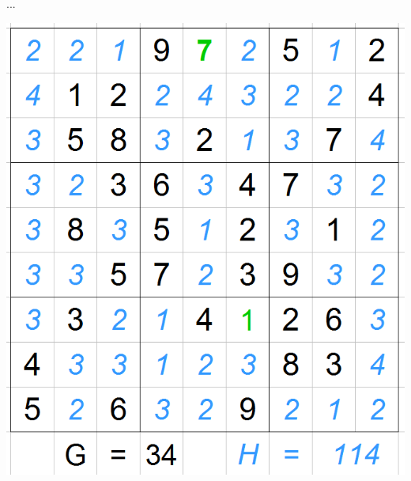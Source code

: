 \begin{frame}
\begin{minipage}{.45\textwidth}
\end{minipage}\hfill
\begin{minipage}{.05\textwidth}
\huge{...}

\end{minipage}\hfill
\begin{minipage}{.45\textwidth}

\includegraphics[scale=0.3]{images/ASTARExample/2.png}

\end{minipage}
\end{frame}

